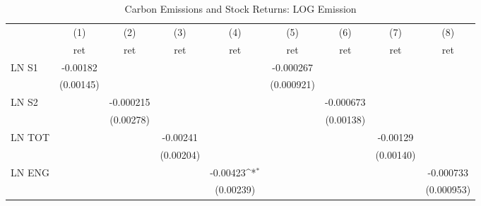 \begin{table}[htbp]\centering
\def\sym#1{\ifmmode^{#1}\else\(^{#1}\)\fi}
\caption{Carbon Emissions and Stock Returns: LOG Emission}
\begin{tabular}{l*{8}{c}}
\hline\hline
                    &\multicolumn{1}{c}{(1)}&\multicolumn{1}{c}{(2)}&\multicolumn{1}{c}{(3)}&\multicolumn{1}{c}{(4)}&\multicolumn{1}{c}{(5)}&\multicolumn{1}{c}{(6)}&\multicolumn{1}{c}{(7)}&\multicolumn{1}{c}{(8)}\\
                    &\multicolumn{1}{c}{ret}&\multicolumn{1}{c}{ret}&\multicolumn{1}{c}{ret}&\multicolumn{1}{c}{ret}&\multicolumn{1}{c}{ret}&\multicolumn{1}{c}{ret}&\multicolumn{1}{c}{ret}&\multicolumn{1}{c}{ret}\\
\hline
LN S1               &    -0.00182         &                     &                     &                     &   -0.000267         &                     &                     &                     \\
                    &   (0.00145)         &                     &                     &                     &  (0.000921)         &                     &                     &                     \\
LN S2               &                     &   -0.000215         &                     &                     &                     &   -0.000673         &                     &                     \\
                    &                     &   (0.00278)         &                     &                     &                     &   (0.00138)         &                     &                     \\
LN TOT              &                     &                     &    -0.00241         &                     &                     &                     &    -0.00129         &                     \\
                    &                     &                     &   (0.00204)         &                     &                     &                     &   (0.00140)         &                     \\
LN ENG              &                     &                     &                     &    -0.00423\sym{*}  &                     &                     &                     &   -0.000733         \\
                    &                     &                     &                     &   (0.00239)         &                     &                     &                     &  (0.000953)         \\

\end{tabular}
\end{table}
